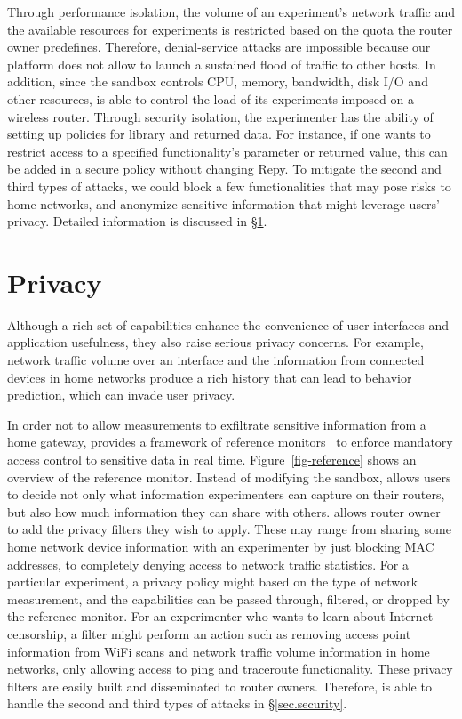 Through performance isolation, the volume of an experiment's network traffic
and the available resources for experiments is restricted based on the quota the
router owner predefines. Therefore, denial-service attacks are impossible because
 our platform does not allow to launch a sustained flood of traffic to other hosts.
 In addition, since the sandbox controls CPU, memory, bandwidth, disk I/O and other
  resources, \sysname is able to control the load of its experiments imposed
   on a wireless router. Through security isolation, the experimenter has the
   ability of setting up policies for library and returned data.
    For instance, if one wants to restrict access to a specified functionality's
    parameter or returned value, this can be added in a secure policy without
    changing Repy. To mitigate the second and third types of attacks,
    we could block a few functionalities that may pose risks to home networks,
    and anonymize sensitive information that might leverage users' privacy.
  Detailed information is discussed in \S{\ref{sec.privacy}}.

\section{Privacy}
\label{sec.privacy}
Although a rich set of capabilities enhance the convenience of user interfaces
and application usefulness, they also raise serious privacy concerns. For example,
 network traffic volume over an interface and the information from connected devices
  in home networks produce a rich history that can lead to behavior prediction,
which can invade user privacy.

In order not to allow measurements to exfiltrate sensitive information from a home
 gateway, \sysname provides a framework of reference monitors~\cite{ref}
  to enforce mandatory access control to sensitive data in real time.
  Figure~\ref{fig-reference} shows an overview of the reference monitor.
  Instead of modifying the sandbox, \sysname allows users to decide not only what
   information experimenters can capture on their routers, but also how much
    information they can share with others. \sysname allows router owner to
    add the privacy filters they wish to apply. These may range from sharing some home
     network device information with an experimenter by just blocking MAC addresses, to
     completely denying access to network traffic statistics. For a particular experiment,
     a privacy policy might based on the type of network measurement, and
     the capabilities can be passed through, filtered, or dropped by the reference monitor.
      For an experimenter who wants to learn about Internet censorship,
      a filter might perform an action such as removing access point information
       from WiFi scans and network traffic volume information in home networks,
       only allowing access to ping and traceroute functionality.
       These privacy filters are easily built and disseminated to router owners.
        Therefore, \sysname is able to handle the second and third types of attacks
        in \S{\ref{sec.security}}.

